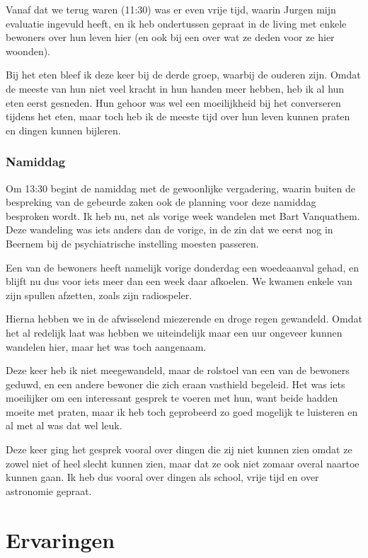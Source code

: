 \documentclass[a4paper,12pt]{article}
\begin{document}
Vanaf dat we terug waren (11:30) was er even vrije tijd, waarin Jurgen mijn evaluatie ingevuld heeft, en ik heb ondertussen gepraat in de living met enkele bewoners over hun leven hier (en ook bij een over wat ze deden voor ze hier woonden).

Bij het eten bleef ik deze keer bij de derde groep, waarbij de ouderen zijn. Omdat de meeste van hun niet veel kracht in hun handen meer hebben, heb ik al hun eten eerst gesneden. Hun gehoor was wel een moeilijkheid bij het converseren tijdens het eten, maar toch heb ik de meeste tijd over hun leven kunnen praten en dingen kunnen bijleren.

\subsubsection{Namiddag}
Om 13:30 begint de namiddag met de gewoonlijke vergadering, waarin buiten de bespreking van de gebeurde zaken ook de planning voor deze namiddag besproken wordt. Ik heb nu, net als vorige week wandelen met Bart Vanquathem. Deze wandeling was iets anders dan de vorige, in de zin dat we eerst nog in Beernem bij de psychiatrische instelling moesten passeren.

Een van de bewoners heeft namelijk vorige donderdag een woedeaanval gehad, en blijft nu dus voor iets meer dan een week daar afkoelen. We kwamen enkele van zijn spullen afzetten, zoals zijn radiospeler.

Hierna hebben we in de afwisselend miezerende en droge regen gewandeld. Omdat het al redelijk laat was hebben we uiteindelijk maar een uur ongeveer kunnen wandelen hier, maar het was toch aangenaam.

Deze keer heb ik niet meegewandeld, maar de rolstoel van een van de bewoners geduwd, en een andere bewoner die zich eraan vasthield begeleid. Het was iets moeilijker om een interessant gesprek te voeren met hun, want beide hadden moeite met praten, maar ik heb toch geprobeerd zo goed mogelijk te luisteren en al met al was dat wel leuk.

Deze keer ging het gesprek vooral over dingen die zij niet kunnen zien omdat ze zowel niet of heel slecht kunnen zien, maar dat ze ook niet zomaar overal naartoe kunnen gaan. Ik heb dus vooral over dingen als school, vrije tijd en over astronomie gepraat.

\section{Ervaringen}
\end{document}
